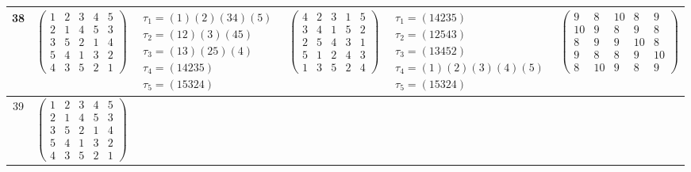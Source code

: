 \begin{longtable}{|c|p{2.7cm}|p{2.7cm}|p{2.7cm}|p{2.7cm}|p{3.3cm}|}
    \hline
    38                                                                                                                                          &
    $\begin{pmatrix}1&2&3&4&5\\2&1&4&5&3\\3&5&2&1&4\\5&4&1&3&2\\4&3&5&2&1\end{pmatrix}$                                                         &
    $\begin{array}{l}\tau_{1}=(1)(2)(34)(5)\\ \tau_{2}=(12)(3)(45)\\ \tau_{3}=(13)(25)(4)\\ \tau_{4}=(14235)\\ \tau_{5}=(15324)\end{array}$     &
    $\begin{pmatrix}4&2&3&1&5\\3&4&1&5&2\\2&5&4&3&1\\5&1&2&4&3\\1&3&5&2&4\end{pmatrix}$                                                         &
    $\begin{array}{l}\tau_{1}=(14235)\\ \tau_{2}=(12543)\\ \tau_{3}=(13452)\\ \tau_{4}=(1)(2)(3)(4)(5)\\ \tau_{5}=(15324)\end{array}$           &
    $\begin{pmatrix}9&8&10&8&9\\10&9&8&9&8\\8&9&9&10&8\\9&8&8&9&10\\8&10&9&8&9\end{pmatrix}$                                                                                                                                \\
    \hline
    39                                                                                                                                          &
    $\begin{pmatrix}1&2&3&4&5\\2&1&4&5&3\\3&5&2&1&4\\5&4&1&3&2\\4&3&5&2&1\end{pmatrix}$                                                         &

\end{longtable}
